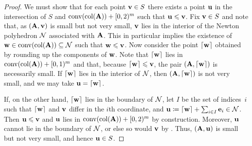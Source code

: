 \documentclass{article}
\begin{document}
\begin{proof}
   We must show that for each point $\mathbf{v} \in S$ there exists a point $\mathbf{u}$ in the intersection of $S$ and $\operatorname{conv}(\operatorname{col}(\mathbf{A})) + [0,2)^m$ such that $\mathbf{u}\leqslant \mathbf{v}$.
   Fix $\mathbf{v} \in S$ and note that, as $(\mathbf{A},\mathbf{v})$ is small but not very small, $\mathbf{v}$ lies in the interior of the Newton polyhedron $\mathcal{N}$ associated with $\mathbf{A}$.
   This in particular implies the existence of $\mathbf{w} \in \operatorname{conv}(\operatorname{col}(\mathbf{A})) \subseteq \mathcal{N}$ such that $\mathbf{w} \leqslant \mathbf{v}$.
   Now consider the point $\left\lceil \mathbf{w} \right\rceil$ obtained by rounding up the components of $\mathbf{w}$.
   Note that $\left\lceil \mathbf{w} \right\rceil$ lies in $\operatorname{conv}(\operatorname{col}(\mathbf{A})) + [0,1)^m$ and that, because $\left\lceil \mathbf{w} \right\rceil \leqslant \mathbf{v}$, the pair $(\mathbf{A},\left\lceil \mathbf{w} \right\rceil)$ is necessarily small.
   If $\left\lceil \mathbf{w} \right\rceil$ lies in the interior of $\mathcal{N}$, then $(\mathbf{A},\left\lceil \mathbf{w} \right\rceil)$ is not very small, and we may take $\mathbf{u} = \left\lceil \mathbf{w} \right\rceil$.

   If, on the other hand, $\left\lceil \mathbf{w} \right\rceil$ lies in the boundary of $\mathcal{N}$, let $I$ be the set of indices~$i$ such that $\left\lceil \mathbf{w} \right\rceil$ and $\mathbf{v}$ differ in the $i$th coordinate, and $\mathbf{u} \coloneqq \left\lceil \mathbf{w} \right\rceil + \sum_{i\in I} \mathbf{e}_i \in \mathcal{N}$.
   Then $\mathbf{u} \leqslant \mathbf{v}$ and $\mathbf{u}$ lies in $\operatorname{conv}(\operatorname{col}(\mathbf{A})) + [0,2)^m$ by construction.
   Moreover, $\mathbf{u}$ cannot lie in the boundary of $\mathcal{N}$, or else so would $\mathbf{v}$ by .
   Thus, $(\mathbf{A},\mathbf{u})$ is small but not very small, and hence  $\mathbf{u} \in S$. 
\end{proof}
\end{document}
